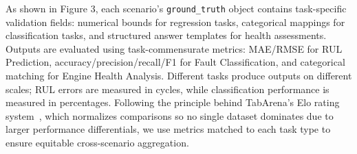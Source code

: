 \documentclass[sigconf]{acmart}
\begin{document}

As shown in Figure 3, each scenario's \texttt{ground\_truth} object contains task-specific validation fields: numerical bounds for regression tasks, categorical mappings for classification tasks, and structured answer templates for health assessments. Outputs are evaluated using task-commensurate metrics: MAE/RMSE for RUL Prediction, accuracy/precision/recall/F1 for Fault Classification, and categorical matching for Engine Health Analysis. Different tasks produce outputs on different scales; RUL errors are measured in cycles, while classification performance is measured in percentages. Following the principle behind TabArena's Elo rating system~\cite{tabarena2024_placeholder}, which normalizes comparisons so no single dataset dominates due to larger performance differentials, we use metrics matched to each task type to ensure equitable cross-scenario aggregation. 




\end{document}
